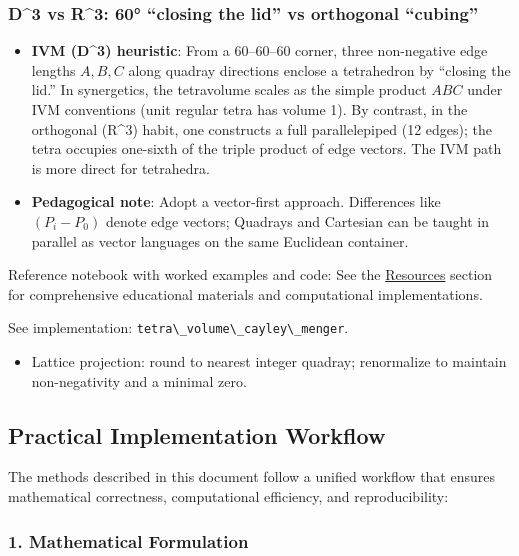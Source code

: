 \documentclass[
  10pt,
]{article}
\newcommand{\passthrough}[1]{#1}
\providecommand{\tightlist}{%
  \setlength{\itemsep}{0pt}\setlength{\parskip}{0pt}}
\begin{document}
\subsubsection{D\^{}3 vs R\^{}3: 60° ``closing the lid'' vs orthogonal
``cubing''}\label{d3-vs-r3-60-closing-the-lid-vs-orthogonal-cubing}

\begin{itemize}
\tightlist
\item
  \textbf{IVM (D\^{}3) heuristic}: From a 60--60--60 corner, three
  non-negative edge lengths \(A,B,C\) along quadray directions enclose a
  tetrahedron by ``closing the lid.'' In synergetics, the tetravolume
  scales as the simple product \(ABC\) under IVM conventions (unit
  regular tetra has volume 1). By contrast, in the orthogonal (R\^{}3)
  habit, one constructs a full parallelepiped (12 edges); the tetra
  occupies one-sixth of the triple product of edge vectors. The IVM path
  is more direct for tetrahedra.
\item
  \textbf{Pedagogical note}: Adopt a vector-first approach. Differences
  like \((P_i-P_0)\) denote edge vectors; Quadrays and Cartesian can be
  taught in parallel as vector languages on the same Euclidean
  container.
\end{itemize}

Reference notebook with worked examples and code: See the
\href{07_resources.md}{Resources} section for comprehensive educational
materials and computational implementations.

See implementation:
\passthrough{\lstinline!tetra\_volume\_cayley\_menger!}.

\begin{itemize}
\tightlist
\item
  Lattice projection: round to nearest integer quadray; renormalize to
  maintain non-negativity and a minimal zero.
\end{itemize}

\subsection{Practical Implementation
Workflow}\label{practical-implementation-workflow}

The methods described in this document follow a unified workflow that
ensures mathematical correctness, computational efficiency, and
reproducibility:

\subsubsection{1. Mathematical
Formulation}\label{mathematical-formulation}
\end{document}
